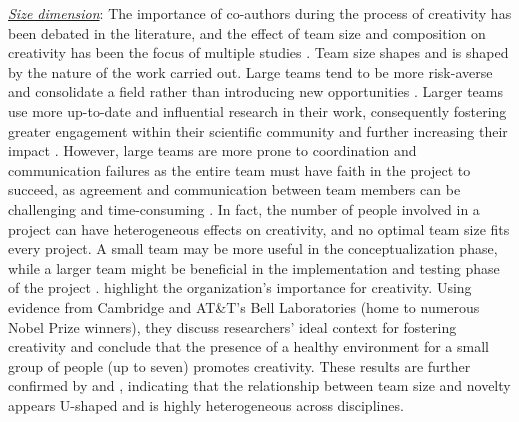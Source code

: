          \underline{\textit{Size dimension}}: The importance of co-authors during the process of creativity has been debated in the literature, and the effect of team size and composition on creativity has been the focus of multiple studies \citep{paulus2003group, shin2007educational, wuchty2007increasing, falk2011mapping, erren2017small,mueller2019building}. Team size shapes and is shaped by the nature of the work carried out. Large teams tend to be more risk-averse and consolidate a field rather than introducing new opportunities \citep{christensen2003innovator,paulus2013understanding,lakhani2013prize,wu2019large}. Larger teams use more up-to-date and influential research in their work, consequently fostering greater engagement within their scientific community and further increasing their impact \citep{wu2019large}. However, large teams are more prone to coordination and communication failures as the entire team must have faith in the project to succeed, as agreement and communication between team members can be challenging and time-consuming \citep{bikard2015exploring}. In fact, the number of people involved in a project can have heterogeneous effects on creativity, and no optimal team size fits every project. A small team may be more useful in the conceptualization phase, while a larger team might be beneficial in the implementation and testing phase of the project \citep{wang2021science}. \cite{shin2007educational} highlight the organization's importance for creativity. Using evidence from Cambridge and AT\&T's Bell Laboratories (home to numerous Nobel Prize winners), they discuss researchers' ideal context for fostering creativity and conclude that the presence of a healthy environment for a small group of people (up to seven) promotes creativity. These results are further confirmed by \cite{lee2015creativity} and \cite{carayol2019}, indicating that the relationship between team size and novelty appears U-shaped and is highly heterogeneous across disciplines. \\


